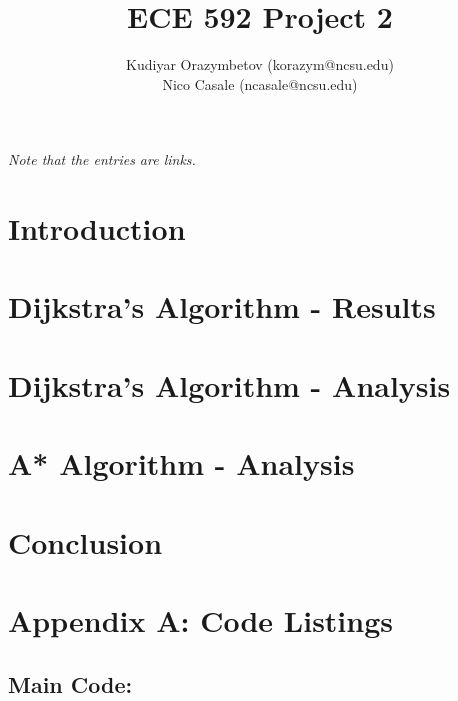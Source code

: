 \documentclass[]{../ncmathy}
\begin{document}
\title{ECE 592 Project 2}
\author{Kudiyar Orazymbetov (korazym@ncsu.edu)\\Nico Casale (ncasale@ncsu.edu)}
\makeTitlePage

\textit{Note that the entries are links.}
\tableofcontents
\listoftables
\listoffigures
\lstlistoflistings

\pagebreak

\section{Introduction}
	
	
	
\section{Dijkstra's Algorithm - Results}

	
	\pagebreak
	
\section{Dijkstra's Algorithm - Analysis}

	

\section{A* Algorithm - Analysis}

	

\section{Conclusion}

	

\pagebreak

\section{Appendix A: Code Listings}
	
	\subsection{Main Code: }
		
	
\end{document}
